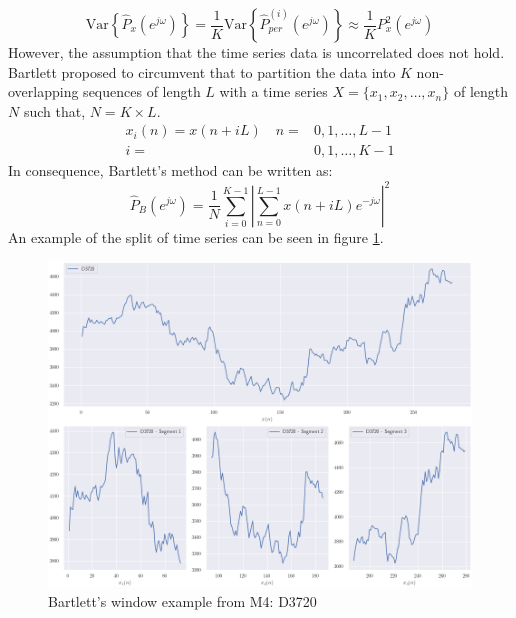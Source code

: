 \documentclass[phd,black, hidelinks]{PrincetonThesis}
\newcommand{\euler}{e}
\begin{document}
\begin{equation}
\text{Var} \left\{ \hat{P}_x(\euler^{j\omega})  \right\}= \frac{1}{K} \text{Var}\left\{ \hat{P}_{per}^{(i)}(e^{j\omega}) \right\} \approx \frac{1}{K}P_x^2(\euler^{j\omega})
\end{equation}
However, the assumption that the time series data is uncorrelated does not hold. Bartlett proposed to circumvent that to partition the data into \(K\) non-overlapping sequences of length \(L\) with a time series \(X = \{x_1,x_2,\dots,x_n\}\) of length \(N\) such that, \(N = K \times L\).
\begin{equation}
\begin{aligned}
x_i(n) = x(n + iL) \quad n = & 0,1,\dots,L-1 \\
                         i = & 0,1,\dots,K-1
\end{aligned}
\end{equation}
In consequence, Bartlett's method can be written as:
\begin{equation}
\hat{P}_B(e^{j\omega}) = \frac{1}{N} \sum_{i=0}^{K-1} \left\lvert \sum_{n=0}^{L-1} x(n + iL)e^{-j\omega} \right\rvert^2
\end{equation}
An example of the split of time series can be seen in figure \ref{fig:org3630361}.
\begin{figure}[htbp]
\centering
\includegraphics[width=.9\linewidth]{./img/bartlett_example.png}
\caption{\label{fig:org3630361}Bartlett's window example from M4: D3720}
\end{figure}
\end{document}
